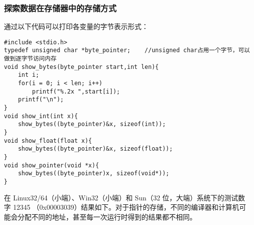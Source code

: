 \subsubsection{探索数据在存储器中的存储方式}
通过以下代码可以打印各变量的字节表示形式：
\begin{verbatim}
#include <stdio.h>
typedef unsigned char *byte_pointer;    //unsigned char占用一个字节，可以做到逐字节访问内存
void show_bytes(byte_pointer start,int len){
    int i;
    for(i = 0; i < len; i++)
        printf("%.2x ",start[i]);
    printf("\n");
}
void show_int(int x){
    show_bytes((byte_pointer)&x, sizeof(int));
}
void show_float(float x){
    show_bytes((byte_pointer)&x, sizeof(float));
}
void show_pointer(void *x){
    show_bytes((byte_pointer)x, sizeof(void*));
}
\end{verbatim}
在 Linux32/64（小端）、Win32（小端）和 Sun（32 位，大端）系统下的测试数字 12345 （0x00003039）结果如下。对于指针的存储，不同的编译器和计算机可能会分配不同的地址，甚至每一次运行时得到的结果都不相同。
